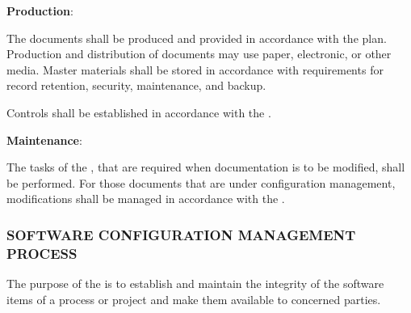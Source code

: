 \begin{adjustwidth}{2em}{0pt}
\begin{compactenum}
\begin{compactenum}
					\end{compactenum}

					\item {\bf Production}:
					\begin{compactenum}

						\item The documents shall be produced and provided in accordance with the plan. Production and distribution of documents may use paper, electronic, or other media. Master materials shall be stored in accordance with requirements for record retention, security, maintenance, and backup.

						\item Controls shall be established in accordance with the .

					\end{compactenum}

					\item {\bf Maintenance}:
					\begin{compactenum}

						\item The tasks of the , that are required when documentation is to be modified, shall be performed. For those documents that are under configuration management, modifications shall be managed in accordance with the \nameref{proc:software_configuration_management_process}.

					\end{compactenum}

				\end{compactenum}

			\end{adjustwidth}

		\newpage
		\subsubsection{SOFTWARE CONFIGURATION MANAGEMENT PROCESS\label{proc:software_configuration_management_process}}

			\subsubsubsection{PURPOSE}
			\begin{adjustwidth}{2em}{0pt} 

				The purpose of the  is to establish and maintain the integrity of the software items of a process or project and make them available to concerned parties.

			\end{adjustwidth}

